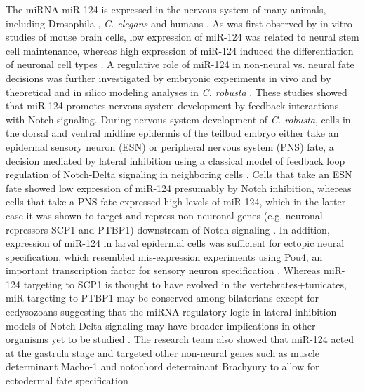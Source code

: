 \documentclass[graybox]{svmult}
\begin{document}
The miRNA miR-124 is expressed in the nervous system of many animals, including 
Drosophila \cite{Aboobaker18017}, \textit{C. elegans} \cite{Clark:2010} and 
humans \cite{Sempere2004}. As was first observed by in vitro studies of mouse 
brain cells, low expression of miR-124 was related to neural stem cell 
maintenance, whereas high expression of miR-124 induced the differentiation of 
neuronal cell types \cite{Cheng:2009qf}. A regulative role of 
miR-124 in non-neural vs. neural fate decisions was further investigated by 
embryonic experiments in vivo \cite{Chen4943} and by 
theoretical and in silico modeling analyses in \textit{C. robusta} 
\cite{Chen2014}. These studies showed that miR-124 promotes 
nervous system development by feedback interactions with Notch signaling. 
During nervous system development of \textit{C. robusta}, cells in the dorsal 
and ventral midline epidermis of the teilbud embryo either take an epidermal 
sensory neuron (ESN) or peripheral nervous system (PNS) fate, a decision 
mediated by lateral inhibition using a classical model of feedback loop 
regulation of Notch-Delta signaling in neighboring cells \cite{Collier:1996, 
Chen2014}. Cells that take an ESN fate showed low expression of miR-124 
presumably by Notch inhibition, whereas cells that take a PNS fate expressed 
high levels of miR-124, which in the latter case it was shown to target and 
repress non-neuronal genes (e.g. neuronal repressors SCP1 and PTBP1) downstream 
of Notch signaling \cite{Chen4943}. In addition, expression 
of miR-124 in larval epidermal cells was sufficient for ectopic neural 
specification, which resembled mis-expression experiments using Pou4, an 
important transcription factor for sensory neuron specification 
\cite{Chen4943, JoyceTang2013}. Whereas miR-124 targeting to SCP1 is thought to 
have evolved in the vertebrates+tunicates, miR targeting to PTBP1 may be 
conserved among bilaterians except for ecdysozoans \cite{Chen4943} suggesting 
that the miRNA regulatory logic in lateral inhibition models of Notch-Delta 
signaling may have broader implications in other organisms yet to be studied 
\cite{Chen2014}. The research team also showed that miR-124 
acted at the gastrula stage and targeted other non-neural genes such as muscle 
determinant Macho-1 and notochord determinant Brachyury to allow for ectodermal 
fate specification \cite{Chen4943}.
\end{document}
